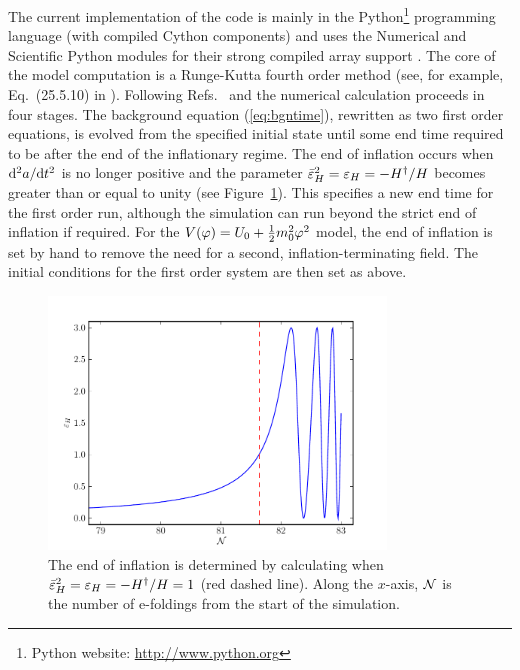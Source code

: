 The current implementation of the code is mainly in the Python\footnote{Python
website: \url{http://www.python.org}} programming language (with compiled Cython
components) and uses the
Numerical and Scientific Python modules for their strong compiled array support
\cite{scipy}. The core of the model computation is a
Runge-Kutta fourth order method (see, for example, Eq.~(25.5.10) in
\cite{abramowitz+stegun}).  Following
Refs.~\cite{Martin:2006rs} and \cite{Ringeval:2007am} the numerical calculation
proceeds in four stages. The background equation (\ref{eq:bgntime}),
rewritten as two first order equations, is
evolved from the specified initial state until some end time required
to be after the end of the inflationary regime.  The end of inflation
occurs when $\mathrm{d}^2a/\mathrm{d} t^2$ is no longer positive and the parameter
$\bar{\varepsilon}^2_H = \varepsilon_H= -H^{\dagger}/H$ becomes greater than or
equal to unity
(see Figure~\ref{fig:eps}). This specifies a new end time for the first
order run, although the simulation can run beyond the strict end of
inflation if required. For the $V(\varphi)=U_0 + \frac{1}{2} m_0^2 \varphi^2$ model, the end of inflation is
set by hand to remove the need for a second, inflation-terminating field. The initial
conditions for the first order system are then set as above.
%
\begin{figure}[htbp]
\centering
 \includegraphics[width=0.8\textwidth]{./numerical/graphs/bgepsilon}
 \caption[Plot of $\varepsilon_H$ near the end of inflation]{The end of
inflation is
determined by calculating when
   $\bar{\varepsilon}^2_H = \varepsilon_H=-H^{\dagger}/H=1$ (red dashed line). Along the
$x$-axis,
   $\mathcal{N}$ is the number of e-foldings from the start of the
   simulation.}
\label{fig:eps}
\end{figure}


